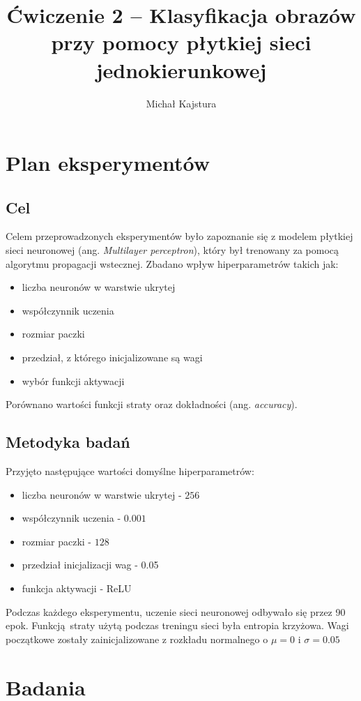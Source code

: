 \documentclass{article}
\title{Ćwiczenie 2 – Klasyfikacja obrazów przy pomocy płytkiej sieci jednokierunkowej}
\author{Michał Kajstura}
\begin{document}
\maketitle

\tableofcontents
\raggedbottom
\pagebreak

\section{Plan eksperymentów}
\subsection{Cel}
Celem przeprowadzonych eksperymentów było zapoznanie się z modelem
płytkiej sieci neuronowej (ang. \textit{Multilayer perceptron}),
który był trenowany za pomocą algorytmu propagacji wstecznej.
Zbadano wpływ hiperparametrów takich jak:
\begin{itemize}
  \item liczba neuronów w warstwie ukrytej
  \item współczynnik uczenia
  \item rozmiar paczki
  \item przedział, z którego inicjalizowane są wagi
  \item wybór funkcji aktywacji
\end{itemize}
Porównano wartości funkcji straty oraz dokładności (ang. \textit{accuracy}).

\subsection{Metodyka badań}
Przyjęto następujące wartości domyślne hiperparametrów:
\begin{itemize}
  \item liczba neuronów w warstwie ukrytej - $256$
  \item współczynnik uczenia - $0.001$
  \item rozmiar paczki - $128$
  \item przedział inicjalizacji wag - 0.05
  \item funkcja aktywacji - ReLU
\end{itemize}
Podczas każdego eksperymentu, uczenie sieci neuronowej odbywało się przez 90 epok.
Funkcją straty użytą podczas treningu sieci była entropia krzyżowa.
Wagi początkowe zostały zainicjalizowane z rozkładu normalnego
o $\mu = 0$ i $\sigma = 0.05$

\raggedbottom
\pagebreak
\section{Badania}
\end{document}
